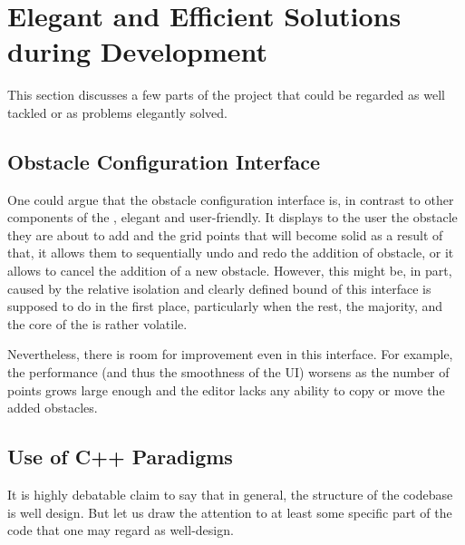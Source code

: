 \documentclass[11pt,a4paper,twoside,openright]{report}
\begin{document}
\section{Elegant and Efficient Solutions during Development}
This section discusses a few parts of the project that could be regarded as well tackled or as problems elegantly solved.

\subsection{Obstacle Configuration Interface}
One could argue that the obstacle configuration interface is, in contrast to other components of the \software{}, elegant and user-friendly. It displays to the user the obstacle they are about to add and the grid points that will become solid as a result of that, it allows them to sequentially undo and redo the addition of obstacle, or it allows to cancel the addition of a new obstacle. However, this might be, in part, caused by the relative isolation and clearly defined bound of this interface is supposed to do in the first place, particularly when the rest, the majority, and the core of the \software{} is rather volatile.

Nevertheless, there is room for improvement even in this interface. For example, the performance (and thus the smoothness of the UI) worsens as the number of points grows large enough and the editor lacks any ability to copy or move the added obstacles.

\subsection{Use of C++ Paradigms}
It is highly debatable claim to say that in general, the structure of the codebase is well design. But let us draw the attention to at least some specific part of the code that one may regard as well-design.
\end{document}
